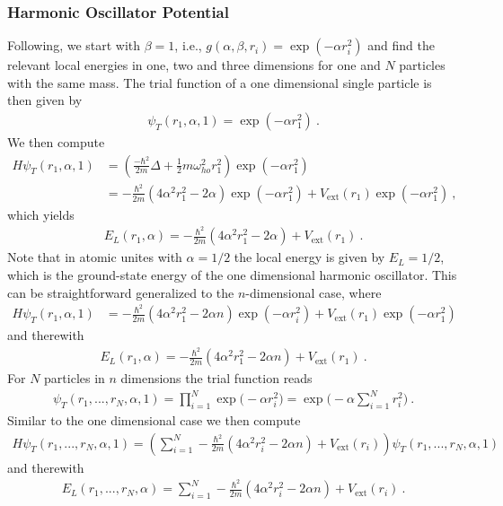 \documentclass[11pt,a4paper]{article}
\numberwithin{equation}{section}
\begin{document}
\subsubsection{Harmonic Oscillator Potential}
Following, we start with $\beta =1$, i.e., $g(\alpha, \beta, r_i)=\exp(-\alpha r_i^2)$ and find the relevant local energies in one, two and three dimensions for one and $N$ particles with the same mass. 
%
The trial function of a one dimensional single particle is then given by
\begin{align*}
\psi_T(r_1,\alpha,1) = \exp(-\alpha r_1^2)~.
\end{align*}
We then compute 
\begin{align*}
H\psi_T(r_1,\alpha,1)
&=
\left(\frac{-\hbar^2}{2m}\Delta +\frac{1}{2}m\omega_{ho}^2r_1^2\right)\exp(-\alpha r_1^2)\\
&=
-\frac{\hbar^2}{2m}\left(4\alpha^2r_1^2-2\alpha\right)\exp(-\alpha r_1^2)+V_{\mathrm{ext}}(r_1)\exp(-\alpha r_1^2)~,
\end{align*}
which yields 
\begin{align*}
E_L(r_1,\alpha)
=
-\frac{\hbar^2}{2m}\left(4\alpha^2r_1^2-2\alpha\right)+V_{\mathrm{ext}}(r_1)~.
\end{align*}
Note that in atomic unites with $\alpha=1/2$ the local energy is given by $E_L = 1/2$, which is the ground-state energy of the one dimensional harmonic oscillator.
% 
This can be straightforward generalized to the $n$-dimensional case, where
\begin{align*}
H\psi_T(r_1,\alpha,1)
&=
-\frac{\hbar^2}{2m}\left(4\alpha^2r_1^2-2\alpha n\right)\exp(-\alpha r_i^2)+V_{\mathrm{ext}}(r_1)\exp(-\alpha r_1^2)
\end{align*}
and therewith
\begin{align*}
E_L(r_1,\alpha)
=
-\frac{\hbar^2}{2m}\left(4\alpha^2r_1^2-2\alpha n\right)+V_{\mathrm{ext}}(r_1)~.
\end{align*}
For $N$ particles in $n$ dimensions the trial function reads
\begin{align*}
\psi_T(r_1,...,r_N,\alpha,1)
=
\prod_{i=1}^N\exp\big(-\alpha r_i^2\big)
=
\exp\big(-\alpha \sum_{i=1}^Nr_i^2\big)~.
\end{align*}
Similar to the one dimensional case we then compute
\begin{align*}
H\psi_T(r_1,...,r_N,\alpha,1)
=
\left(\sum_{i=1}^N-\frac{\hbar^2}{2m}\left(4\alpha^2r_i^2-2\alpha n\right)
+V_{\mathrm{ext}}(r_i)\right)\psi_T(r_1,...,r_N,\alpha,1)
\end{align*}
and therewith 
\begin{align*}
E_L(r_1,...,r_N,\alpha)
=
\sum_{i=1}^N-\frac{\hbar^2}{2m}\left(4\alpha^2r_i^2-2\alpha n\right)
+V_{\mathrm{ext}}(r_i)~.
\end{align*}
\end{document}

